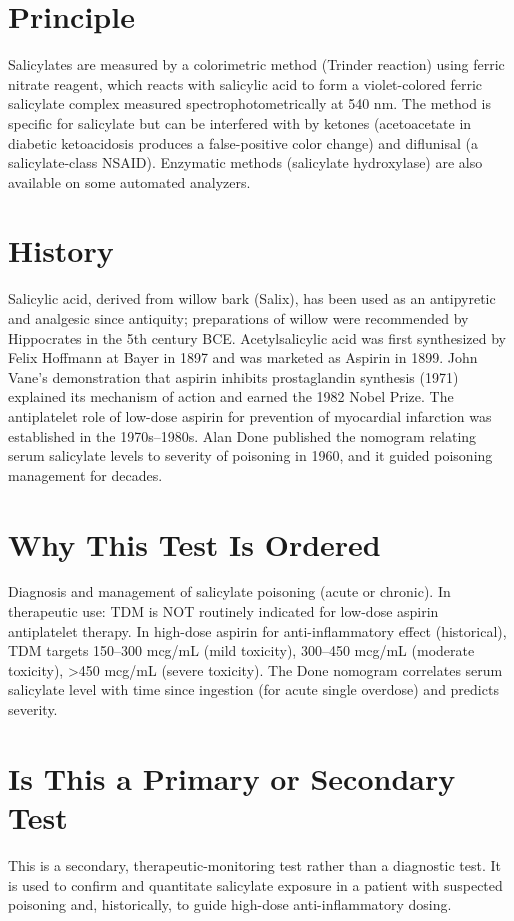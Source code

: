 \section*{Principle}
Salicylates are measured by a colorimetric method (Trinder reaction) using ferric nitrate reagent, which reacts with salicylic acid to form a violet-colored ferric salicylate complex measured spectrophotometrically at 540 nm. The method is specific for salicylate but can be interfered with by ketones (acetoacetate in diabetic ketoacidosis produces a false-positive color change) and diflunisal (a salicylate-class NSAID). Enzymatic methods (salicylate hydroxylase) are also available on some automated analyzers.
\section*{History}
Salicylic acid, derived from willow bark (Salix), has been used as an antipyretic and analgesic since antiquity; preparations of willow were recommended by Hippocrates in the 5th century BCE. Acetylsalicylic acid was first synthesized by Felix Hoffmann at Bayer in 1897 and was marketed as Aspirin in 1899. John Vane's demonstration that aspirin inhibits prostaglandin synthesis (1971) explained its mechanism of action and earned the 1982 Nobel Prize. The antiplatelet role of low-dose aspirin for prevention of myocardial infarction was established in the 1970s--1980s. Alan Done published the nomogram relating serum salicylate levels to severity of poisoning in 1960, and it guided poisoning management for decades.
\section*{Why This Test Is Ordered}
Diagnosis and management of salicylate poisoning (acute or chronic). In therapeutic use: TDM is NOT routinely indicated for low-dose aspirin antiplatelet therapy. In high-dose aspirin for anti-inflammatory effect (historical), TDM targets 150--300 mcg/mL (mild toxicity), 300--450 mcg/mL (moderate toxicity), >450 mcg/mL (severe toxicity). The Done nomogram correlates serum salicylate level with time since ingestion (for acute single overdose) and predicts severity.
\section*{Is This a Primary or Secondary Test}
This is a secondary, therapeutic-monitoring test rather than a diagnostic test. It is used to confirm and quantitate salicylate exposure in a patient with suspected poisoning and, historically, to guide high-dose anti-inflammatory dosing.
